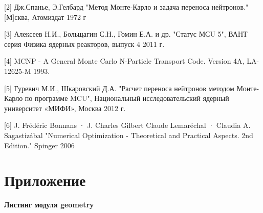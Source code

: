 \documentclass[pdftex,ptm,12pt,a4paper]{report}
\begin{document}
[2] Дж.Спанье, Э.Гелбард "Метод Монте-Карло и задача переноса нейтронов."
[М]сква, Атомиздат 1972 г

[3] Алексеев Н.И., Больщагин С.Н., Гомин Е.А. и др. "Статус МСU 5", ВАНТ серия Физика ядерных реакторов, выпуск 4 2011 г.

[4] MCNP - A General Monte Carlo N-Particle Transport Code. Version 4A, LA-12625-M 1993.

[5] Гуревич М.И., Шкаровский Д.А. "Расчет переноса нейтронов методом Монте-Карло по программе MCU", Национальный исследовательский ядерный университет
 «МИФИ», Москва 2012 г.

[6] J. Frédéric Bonnans · J. Charles Gilbert
Claude Lemaréchal · Claudia A. Sagastizábal "Numerical Optimization - Theoretical and Practical Aspects. 2nd Edition." Spinger 2006

\clearpage

\chapter{Приложение}

\textbf{Листинг модуля geometry}
\end{document}

